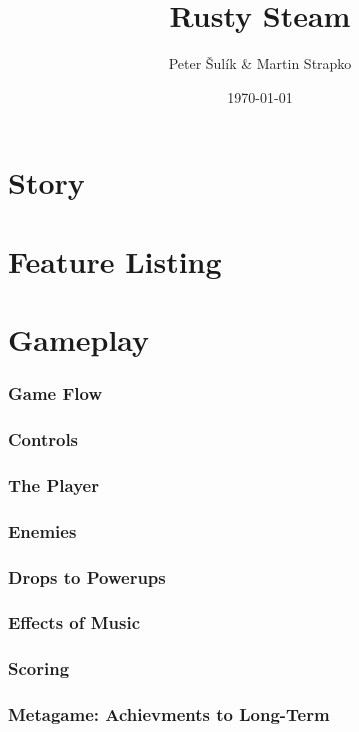 \documentclass[a4paper]{report}
\title{Rusty Steam}
\author{Peter Šulík & Martin Strapko}
\date{\today}
\begin{document}
\maketitle

\tableofcontents
 
\part{Story}
 
\part{Feature Listing}
 
\part{Gameplay}
\section{Game Flow}
 
\section{Controls}
 
\section{The Player}
 
\section{Enemies}
 
\section{Drops to Powerups}
 
\section{Effects of Music}
 
\section{Scoring}
 
\section{Metagame: Achievments to Long-Term}
 
\end{document}
